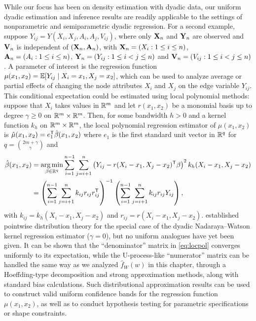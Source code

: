 While our focus has been on density estimation with dyadic data,
our uniform dyadic estimation and inference results are readily applicable
to the settings of nonparametric and semiparametric dyadic regression.
For a second example, suppose $Y_{i j} = Y(X_i, X_j, A_i, A_j, V_{i j})$,
where only $\mathbf{X}_n$ and $\mathbf{Y}_n$ are observed and
$\mathbf{V}_n$ is independent of $(\mathbf{X}_n, \mathbf{A}_n)$,
with $\mathbf{X}_n = (X_i : 1 \leq i \leq n)$,
$\mathbf{A}_n = (A_i : 1 \leq i \leq n)$, $\mathbf{Y}_n = (Y_{i j}:1\leq i<j\leq n)$
and $\mathbf{V}_n = (V_{i j} : 1 \leq i < j \leq n)$.
A parameter of interest is the regression function
$\mu(x_1, x_2) = \mathbb{E}[Y_{i j} \mid X_i=x_1, X_j=x_2]$,
which can be used to analyze average or partial effects
of changing the node attributes $X_i$ and $X_j$ on the edge variable $Y_{i j}$.
This conditional expectation could be estimated using local polynomial methods:
suppose that $X_i$ takes values in $\mathbb{R}^m$ and
let $r(x_1, x_2)$ be a monomial basis up to degree
$\gamma \geq 0$ on $\mathbb{R}^m \times \mathbb{R}^m$. Then, for some bandwidth $h > 0$ and
a kernel function $k_h$ on $\mathbb{R}^m \times \mathbb{R}^m$,
the local polynomial regression estimator of $\mu(x_1, x_2)$ is
$\hat\mu(x_1, x_2) = e_1^{\mathsf{T}} \hat\beta(x_1, x_2)$ where
$e_1$ is the first standard unit vector in $\mathbb{R}^q$ for
$q=\binom{2m+\gamma}{\gamma}$ and
%
\begin{align}
  \nonumber
  \hat{\beta}(x_1, x_2)
  &=
  \operatorname*{arg\,min}_{\beta \in \mathbb{R}^q}
  \sum_{i=1}^{n-1} \sum_{j=i+1}^n
  \left( Y_{i j} - r(X_i-x_1, X_j-x_2)^{\mathsf{T}} \beta \right)^2
  k_h(X_i-x_1, X_j-x_2) \\
  \label{eq:locpol}
  &=
  \left(
    \sum_{i=1}^{n-1} \sum_{j=i+1}^n k_{i j} r_{i j} r_{i j}^{\mathsf{T}}
  \right)^{-1}
  \left(
    \sum_{i=1}^{n-1} \sum_{j=i+1}^n k_{i j} r_{i j} Y_{i j}
  \right),
\end{align}
with $k_{i j} = k_h(X_i-x_1, X_j-x_2)$ and $r_{i j} = r(X_i-x_1, X_j-x_2)$.
\citet{graham2021minimax} established pointwise distribution theory
for the special case of the dyadic Nadaraya--Watson kernel regression estimator
($\gamma=0$), but no uniform analogues have yet been given. It can be shown
that the ``denominator'' matrix in \eqref{eq:locpol} converges uniformly to its
expectation, while the U-process-like ``numerator'' matrix can be handled the
same way as we analyzed $\hat f_W(w)$ in this chapter, through a Hoeffding-type
decomposition and strong approximation methods, along with standard bias
calculations. Such distributional approximation results can be used to
construct valid uniform confidence bands for the regression function
$\mu(x_1, x_2)$, as well as to conduct hypothesis testing for parametric
specifications or shape constraints.

